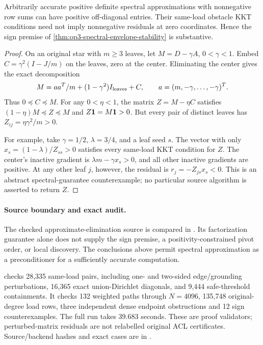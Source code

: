 \begin{proposition}
\label{prop:op3-spectral-factor-sign-obstruction}
Arbitrarily accurate positive definite spectral approximations with
nonnegative row sums can have positive off-diagonal entries. Their
same-load obstacle KKT conditions need not imply nonnegative residuals
at zero coordinates. Hence the sign premise of
\cref{thm:op3-spectral-envelope-stability} is substantive.
\end{proposition}
\begin{proof}
On an original star with $m\geq3$ leaves, let $M=D-\gamma A$,
$0<\gamma<1$. Embed $C=\gamma^2(I-J/m)$ on the leaves, zero at the
center. Eliminating the center gives the exact decomposition
\[
 M=aa^T/m+(1-\gamma^2)I_{\rm leaves}+C,
 \qquad a=(m,-\gamma,\ldots,-\gamma)^T.
\]
Thus $0\preceq C\preceq M$. For any $0<\eta<1$, the matrix
$Z=M-\eta C$ satisfies $(1-\eta)M\preceq Z\preceq M$ and
$Z\mathbf{1}=M\mathbf{1}>0$. But every pair of distinct leaves has
$Z_{ij}=\eta\gamma^2/m>0$.

For example, take $\gamma=1/2$, $\lambda=3/4$, and a leaf seed $s$.
The vector with only $x_s=(1-\lambda)/Z_{ss}>0$ satisfies every
same-load KKT condition for $Z$. The center's inactive gradient is
$\lambda m-\gamma x_s>0$, and all other inactive gradients are positive.
At any other leaf $j$, however, the residual is
$r_j=-Z_{js}x_s<0$. This is an abstract spectral-guarantee
counterexample; no particular source algorithm is asserted to return $Z$.
\end{proof}

\paragraph{Source boundary and exact audit.}
The checked approximate-elimination source
\citep{kyng2016approximate} is compared in
. Its factorization guarantee alone
does not supply the sign premise, a positivity-constrained pivot order,
or local discovery. The conclusions above permit spectral approximation
as a preconditioner for a sufficiently accurate computation.

 checks 28,335 same-load pairs,
including one- and two-sided edge/grounding perturbations, 16,365 exact
union-Dirichlet diagonals, and 9,444 safe-threshold containments.
It checks 132 weighted paths through $N=4096$, 135,748 original-degree
load rows, three independent dense endpoint obstructions and 12 sign
counterexamples. The full run takes 39.683 seconds. These are proof
validators; perturbed-matrix residuals are not relabelled original ACL
certificates. Source/backend hashes and exact cases are in
.
